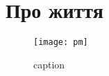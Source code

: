 \documentclass[../../document]{subfiles}
\begin{document}
	\chapter{Про життя}
	\blindtext[2]

	\begin{figure}[H]
		\centering
		\texttt{[image: pm]}
		\caption{caption}
		\label{fig:tag2}
	\end{figure}
	
\end{document}
